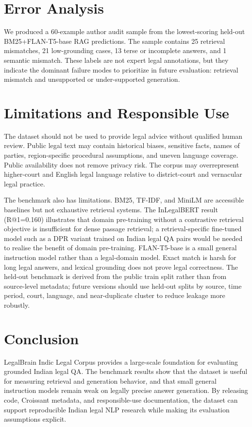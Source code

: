 \documentclass{article}
\begin{document}
\section{Error Analysis}

We produced a 60-example author audit sample from the lowest-scoring held-out BM25+FLAN-T5-base RAG predictions. The sample contains 25 retrieval mismatches, 21 low-grounding cases, 13 terse or incomplete answers, and 1 semantic mismatch. These labels are not expert legal annotations, but they indicate the dominant failure modes to prioritize in future evaluation: retrieval mismatch and unsupported or under-supported generation.

\section{Limitations and Responsible Use}

The dataset should not be used to provide legal advice without qualified human review. Public legal text may contain historical biases, sensitive facts, names of parties, region-specific procedural assumptions, and uneven language coverage. Public availability does not remove privacy risk. The corpus may overrepresent higher-court and English legal language relative to district-court and vernacular legal practice.

The benchmark also has limitations. BM25, TF-IDF, and MiniLM are accessible baselines but not exhaustive retrieval systems. The InLegalBERT result (R@1=0.160) illustrates that domain pre-training without a contrastive retrieval objective is insufficient for dense passage retrieval; a retrieval-specific fine-tuned model such as a DPR variant trained on Indian legal QA pairs would be needed to realise the benefit of domain pre-training. FLAN-T5-base is a small general instruction model rather than a legal-domain model. Exact match is harsh for long legal answers, and lexical grounding does not prove legal correctness. The held-out benchmark is derived from the public train split rather than from source-level metadata; future versions should use held-out splits by source, time period, court, language, and near-duplicate cluster to reduce leakage more robustly.

\section{Conclusion}

LegalBrain Indic Legal Corpus provides a large-scale foundation for evaluating grounded Indian legal QA. The benchmark results show that the dataset is useful for measuring retrieval and generation behavior, and that small general instruction models remain weak on legally precise answer generation. By releasing code, Croissant metadata, and responsible-use documentation, the dataset can support reproducible Indian legal NLP research while making its evaluation assumptions explicit.





\end{document}
